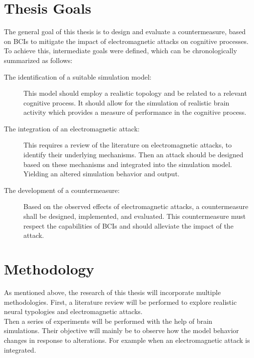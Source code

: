 \section{Thesis Goals}
The general goal of this thesis is to design and evaluate a countermeasure, based on BCIs to mitigate the impact of electromagnetic attacks on cognitive processes. To achieve this, intermediate goals were defined, which can be chronologically summarized as follows:
\begin{description}
    \item[The identification of a suitable simulation model:] This model should employ a realistic topology and be related to a relevant cognitive process. It should allow for the simulation of realistic brain activity which provides a measure of performance in the cognitive process.
    \item[The integration of an electromagnetic attack:] This requires a review of the literature on electromagnetic attacks, to identify their underlying mechanisms. Then an attack should be designed based on these mechanisms and integrated into the simulation model. Yielding an altered simulation behavior and output.
    \item[The development of a countermeasure:] Based on the observed effects of electromagnetic attacks, a countermeasure shall be designed, implemented, and evaluated. This countermeasure must respect the capabilities of BCIs and should alleviate the impact of the attack.
\end{description}


\section{Methodology}
As mentioned above, the research of this thesis will incorporate multiple methodologies. First, a literature review will be performed to explore realistic neural typologies and electromagnetic attacks.\\
Then a series of experiments will be performed with the help of brain simulations. Their objective will mainly be to observe how the model behavior changes in response to alterations. For example when an electromagnetic attack is integrated. 


